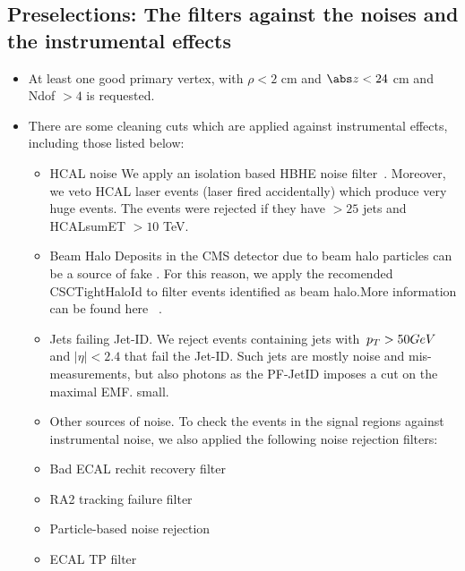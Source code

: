 \subsection{Preselections: The filters against the noises and the instrumental effects}
\label{subsect:presel}
\begin{itemize}

\item At least one good primary vertex, with $\rho<2$ cm and $\abs z<24$ cm and Ndof $>4$ is requested.
\item There are some cleaning cuts which are applied against instrumental effects, including those listed below:
\begin{itemize}
\item HCAL noise We apply an isolation based HBHE noise filter~\cite{c23}. Moreover, we veto HCAL laser
events (laser fired accidentally) which produce very huge events. The events were rejected if they have
$> 25$ jets and HCALsumET $> 10$ TeV.
\item Beam Halo Deposits in the CMS detector due to beam halo particles can be a source of fake \met .
For this reason, we apply the recomended CSCTightHaloId to filter events identified as beam halo.More
information can be found here ~\cite{c24}. 
\item Jets failing Jet-ID. We reject events containing jets with $\,p_T > 50 GeV$ and $|\eta|<2.4$ 
that fail the Jet-ID. Such jets are mostly noise and mis-measurements, but also photons as the PF-JetID imposes a
cut on the maximal EMF. 
small.
\item Other sources of noise. To check the events in the signal regions against instrumental noise, we also
applied the following noise rejection filters: 
\item Bad ECAL rechit recovery filter ~\cite{c25}
\item RA2 tracking failure filter ~\cite{c26} 
\item Particle-based noise rejection ~\cite{c27}
\item ECAL TP filter ~\cite{c28}

\end{itemize}
\end{itemize}

